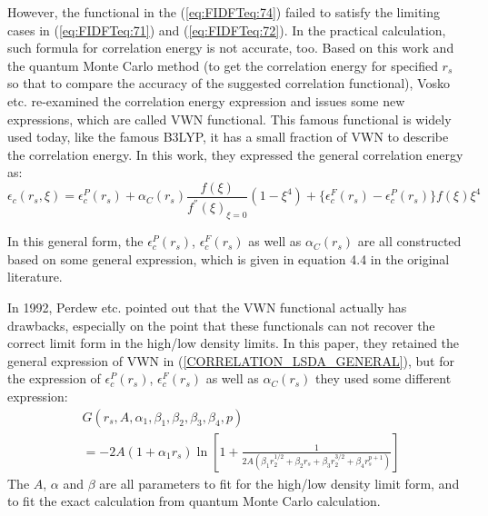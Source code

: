 However, the functional in the (\ref{eq:FIDFTeq:74}) failed to
satisfy the limiting cases in (\ref{eq:FIDFTeq:71}) and
(\ref{eq:FIDFTeq:72}). In the practical calculation, such formula for
correlation energy is not accurate, too. Based on this work and the 
quantum Monte Carlo method\cite{PhysRevLett.45.566} (to get the
correlation energy for specified $r_{s}$ so that to compare the accuracy of
the suggested correlation functional), Vosko etc. re-examined the correlation
energy expression and issues some new expressions, which are called VWN
functional\cite{1980CaJPh..58.1200V}. This famous functional is widely used
today, like the famous B3LYP, it has a small fraction of VWN to describe the
correlation energy. In this work, they expressed the general correlation
energy as:
\begin{equation}
 \label{CORRELATION_LSDA_GENERAL}
\epsilon_{c}(r_{s}, \xi) = \epsilon_{c}^{P}(r_{s}) + \alpha_{C}(r_{s})
\frac{f(\xi)}{f^{''}(\xi)_{\xi=0}}(1-\xi^{4})
+\{
\epsilon_{c}^{F}(r_{s}) - \epsilon_{c}^{P}(r_{s}) \}f(\xi)\xi^{4}
\end{equation}

In this general form, the $\epsilon_{c}^{P}(r_{s})$, 
$\epsilon_{c}^{F}(r_{s})$ as well as $\alpha_{C}(r_{s})$ are all constructed
based on some general expression, which is given in equation 4.4 in the
original literature.

In 1992, Perdew etc. pointed out that the VWN functional actually has
drawbacks, especially on the point that these functionals can not recover the
correct limit form in the high/low density limits\cite{PhysRevB.45.13244}. In
this paper, they retained the general expression of VWN in
(\ref{CORRELATION_LSDA_GENERAL}), but for the expression of
$\epsilon_{c}^{P}(r_{s})$, $\epsilon_{c}^{F}(r_{s})$ as well as
$\alpha_{C}(r_{s})$ they used some different expression:
\begin{equation}
 \label{CORRELATION_LSDA_GENERAL_1}
\begin{split}
& G(r_{s},A, \alpha_{1}, \beta_{1}, \beta_{2}, \beta_{3}, \beta_{4}, p) \\
&=-2A(1+\alpha_{1}r_{s})\ln\left[
1 + 
\frac{1}{2A(\beta_{1}r_{2}^{1/2}+\beta_{2}r_{s}
           +\beta_{3}r_{2}^{3/2}+\beta_{4}r_{s}^{p+1})}
 \right] 
\end{split}
\end{equation}
The $A$, $\alpha$ and $\beta$ are all parameters to fit for the high/low
density limit form, and to fit the exact calculation from quantum Monte Carlo
calculation. 

